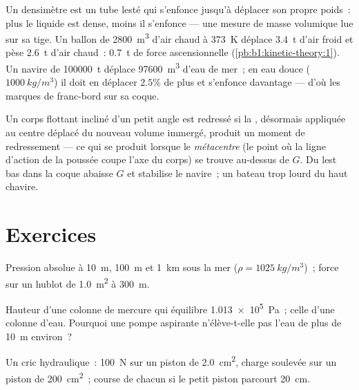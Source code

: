 \begin{example}\label{ex:b1:fluid-statics:buoy}
Un densimètre est un tube lesté qui s'enfonce jusqu'à déplacer son propre
poids~: plus le liquide est dense, moins il s'enfonce --- une mesure de
masse volumique lue sur sa tige. Un ballon de \qty{2800}{m^3} d'air chaud
à \qty{373}{K} déplace \qty{3.4}{t} d'air froid et pèse \qty{2.6}{t} d'air
chaud~: \qty{0.7}{t} de force ascensionnelle (\cref{pb:b1:kinetic-theory:1}).
Un navire de \qty{100000}{t} déplace \qty{97600}{m^3} d'eau de mer~; en eau
douce ($\qty{1000}{kg/m^3}$) il doit en déplacer $2.5\%$ de plus et
s'enfonce davantage --- d'où les marques de franc-bord sur sa coque.
\end{example}

\begin{remark}[Stabilité]\label{rem:b1:fluid-statics:stability}
Un corps flottant incliné d'un petit angle est redressé si la , désormais appliquée au centre déplacé du nouveau volume
immergé, produit un moment de redressement --- ce qui se produit lorsque
le \emph{métacentre} (le point où la ligne d'action de la poussée coupe
l'axe du corps) se trouve au-dessus de $G$. Du lest bas dans la coque
abaisse $G$ et stabilise le navire~; un bateau trop lourd du haut chavire.
\end{remark}

\section{Exercices}

\begin{exercise}[$\star$]\label{exo:b1:fluid-statics:1}
Pression absolue à \qty{10}{m}, \qty{100}{m} et \qty{1}{km} sous la mer
($\rho = \qty{1025}{kg/m^3}$)~; force sur un hublot de \qty{1.0}{m^2} à
\qty{300}{m}.
\end{exercise}

\begin{exercise}[$\star$]\label{exo:b1:fluid-statics:2}
Hauteur d'une colonne de mercure qui équilibre \qty{1.013e5}{Pa}~; celle
d'une colonne d'eau. Pourquoi une pompe aspirante n'élève-t-elle pas l'eau
de plus de \qty{10}{m} environ~?
\end{exercise}

\begin{exercise}[$\star$]\label{exo:b1:fluid-statics:3}
Un cric hydraulique~: \qty{100}{N} sur un piston de \qty{2.0}{cm^2}, charge
soulevée sur un piston de \qty{200}{cm^2}~; course de chacun si le petit
piston parcourt \qty{20}{cm}.
\end{exercise}

